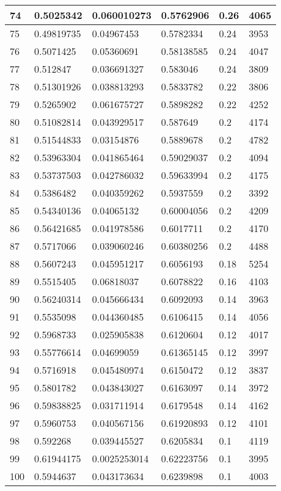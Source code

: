 \begin{longtable}{|l|l|l|l|l|l|}
74 & 0.5025342 & 0.060010273 & 0.5762906 & 0.26 & 4065 \\ \hline 
75 & 0.49819735 & 0.04967453 & 0.5782334 & 0.24 & 3953 \\ \hline 
76 & 0.5071425 & 0.05360691 & 0.58138585 & 0.24 & 4047 \\ \hline 
77 & 0.512847 & 0.036691327 & 0.583046 & 0.24 & 3809 \\ \hline 
78 & 0.51301926 & 0.038813293 & 0.5833782 & 0.22 & 3806 \\ \hline 
79 & 0.5265902 & 0.061675727 & 0.5898282 & 0.22 & 4252 \\ \hline 
80 & 0.51082814 & 0.043929517 & 0.587649 & 0.2 & 4174 \\ \hline 
81 & 0.51544833 & 0.03154876 & 0.5889678 & 0.2 & 4782 \\ \hline 
82 & 0.53963304 & 0.041865464 & 0.59029037 & 0.2 & 4094 \\ \hline 
83 & 0.53737503 & 0.042786032 & 0.59633994 & 0.2 & 4175 \\ \hline 
84 & 0.5386482 & 0.040359262 & 0.5937559 & 0.2 & 3392 \\ \hline 
85 & 0.54340136 & 0.04065132 & 0.60004056 & 0.2 & 4209 \\ \hline 
86 & 0.56421685 & 0.041978586 & 0.6017711 & 0.2 & 4170 \\ \hline 
87 & 0.5717066 & 0.039060246 & 0.60380256 & 0.2 & 4488 \\ \hline 
88 & 0.5607243 & 0.045951217 & 0.6056193 & 0.18 & 5254 \\ \hline 
89 & 0.5515405 & 0.06818037 & 0.6078822 & 0.16 & 4103 \\ \hline 
90 & 0.56240314 & 0.045666434 & 0.6092093 & 0.14 & 3963 \\ \hline 
91 & 0.5535098 & 0.044360485 & 0.6106415 & 0.14 & 4056 \\ \hline 
92 & 0.5968733 & 0.025905838 & 0.6120604 & 0.12 & 4017 \\ \hline 
93 & 0.55776614 & 0.04699059 & 0.61365145 & 0.12 & 3997 \\ \hline 
94 & 0.5716918 & 0.045480974 & 0.6150472 & 0.12 & 3837 \\ \hline 
95 & 0.5801782 & 0.043843027 & 0.6163097 & 0.14 & 3972 \\ \hline 
96 & 0.59838825 & 0.031711914 & 0.6179548 & 0.14 & 4162 \\ \hline 
97 & 0.5960753 & 0.040567156 & 0.61920893 & 0.12 & 4101 \\ \hline 
98 & 0.592268 & 0.039445527 & 0.6205834 & 0.1 & 4119 \\ \hline 
99 & 0.61944175 & 0.0025253014 & 0.62223756 & 0.1 & 3995 \\ \hline 
100 & 0.5944637 & 0.043173634 & 0.6239898 & 0.1 & 4003 \\ \hline 
\end{longtable}